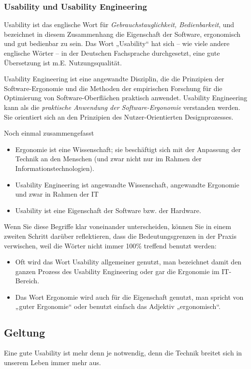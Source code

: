 \subsubsection{Usability und Usability Engineering}
Usability ist das englische Wort für \emph{Gebrauchstauglichkeit, Bedienbarkeit}, und bezeichnet in diesem Zusammenhang die Eigenschaft der Software, ergonomisch und gut bedienbar zu sein. Das Wort „Usability“ hat sich – wie viele andere englische Wörter – in der Deutschen Fachsprache durchgesetzt, eine gute Übersetzung ist m.E. Nutzungsqualität.

Usability Engineering ist eine angewandte Disziplin, die die Prinzipien der Software-Ergonomie und die Methoden der empirischen Forschung für die Optimierung von Software-Oberflächen praktisch anwendet. Usability Engineering kann als die \emph{praktische Anwendung der Software-Ergonomie} verstanden werden. Sie orientiert sich an den Prinzipien des Nutzer-Orientierten Designprozesses.

Noch einmal zusammengefasst
\begin{itemize}
\item Ergonomie ist eine Wissenschaft; sie beschäftigt sich mit der Anpassung der Technik an den Menschen (und zwar nicht nur im Rahmen der Informationstechnologien).
\item Usability Engineering ist angewandte Wissenschaft, angewandte Ergonomie und zwar in Rahmen der IT
\item Usability ist eine Eigenschaft der Software bzw. der Hardware. 
\end{itemize}

Wenn Sie diese Begriffe klar voneinander unterscheiden, können Sie in einem zweiten Schritt darüber reflektieren, dass die Bedeutungsgrenzen in der Praxis verwischen, weil die Wörter nicht immer 100\% treffend benutzt werden: 

\begin{itemize}
\item Oft wird das Wort Usability allgemeiner genutzt, man bezeichnet damit  den ganzen Prozess des Usability Engineering oder gar die Ergonomie im IT-Bereich. 
\item Das Wort Ergonomie wird auch für die Eigenschaft genutzt, man spricht von „guter Ergonomie“ oder benutzt einfach das Adjektiv „ergonomisch“. 
\end{itemize}

\subsection{Geltung}
Eine gute Usability ist mehr denn je notwendig, denn die Technik breitet sich in unserem Leben immer mehr aus. 

